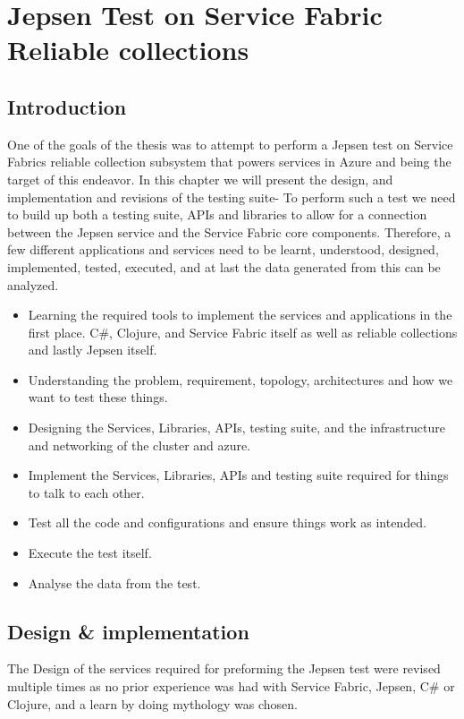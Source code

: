 \documentclass[a4paper,10pt,titlepage]{report}
\begin{document}
    \chapter{Jepsen Test on Service Fabric Reliable collections}


    \section{Introduction}

    One of the goals of the thesis was to attempt to perform a Jepsen test on Service Fabrics reliable collection subsystem that powers services in Azure and being the target of this endeavor. 
    In this chapter we will present the design, and implementation and revisions of the testing suite-
    To perform such a test we need to build up both a testing suite, APIs and libraries to allow for a connection between the Jepsen service and the Service Fabric core components. Therefore, a few different applications and services need to be learnt, understood, designed, implemented, tested, executed, and at last the data generated from this can be analyzed.
    \begin{itemize}
        \item Learning the required tools to implement the services and applications in the first place. C\#, Clojure, and Service Fabric itself as well as reliable collections and lastly Jepsen itself.
        \item Understanding the problem, requirement, topology, architectures and how we want to test these things.
        \item Designing the Services, Libraries, APIs, testing suite, and the infrastructure and networking of the cluster and azure.
        \item Implement the Services, Libraries, APIs and testing suite required for things to talk to each other.
        \item Test all the code and configurations and ensure things work as intended.
        \item Execute the test itself.
        \item Analyse the data from the test.
    \end{itemize}

   
    \section{Design \& implementation}
    The Design of the services required for preforming the Jepsen test were revised multiple times as no prior experience was had with Service Fabric, Jepsen, C\# or Clojure, and a learn by doing mythology was chosen. 
\end{document}
